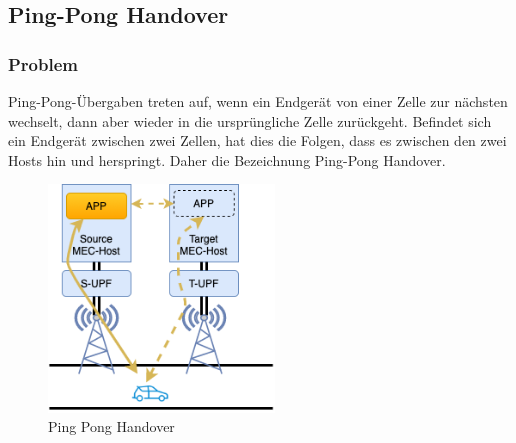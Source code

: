 \documentclass[runningheads]{llncs}
\numberwithin{figure}{section}
\begin{document}
\subsection{Ping-Pong Handover}
\subsubsection{Problem}
Ping-Pong-Übergaben treten auf, wenn ein Endgerät von einer Zelle zur nächsten wechselt, dann aber wieder in die ursprüngliche 
Zelle zurückgeht. Befindet sich ein Endgerät zwischen zwei Zellen, hat dies die Folgen, dass es zwischen den zwei Hosts
hin und herspringt. Daher die Bezeichnung Ping-Pong Handover.
\begin{figure}
  \centering
  \includegraphics[width=6cm]{images/pingpong.png}
  \caption{Ping Pong Handover}
  \label{fig:pingpong}
\end{figure}
\end{document}
